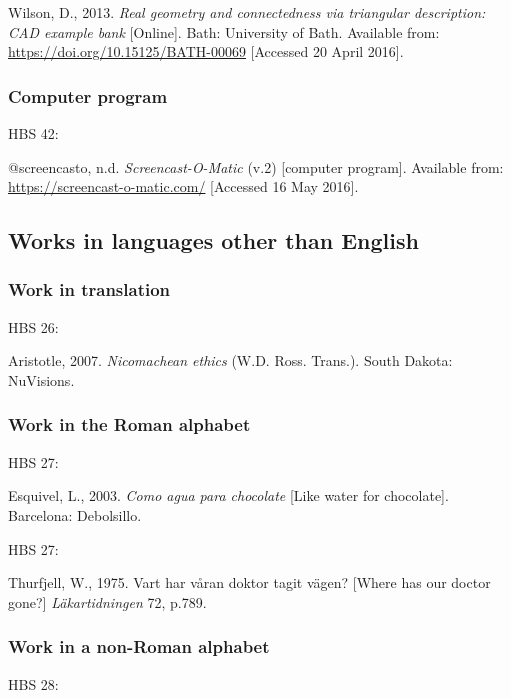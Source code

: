 Wilson, D., 2013. \emph{Real geometry and connectedness via triangular description: CAD example bank} [Online]. Bath: University of Bath. Available from: \url{https://doi.org/10.15125/BATH-00069} [Accessed 20 April 2016].



\subsubsection*{Computer program}

HBS 42: \cite{screencasto}

@screencasto, n.d. \emph{Screencast-O-Matic} (v.2) [computer program]. Available from: \url{https://screencast-o-matic.com/} [Accessed 16 May 2016].



\subsection{Works in languages other than English}

\subsubsection*{Work in translation}

HBS 26: \cite{aristotle2007ne}

Aristotle, 2007. \emph{Nicomachean ethics} (W.D. Ross. Trans.). South Dakota: NuVisions.



\subsubsection*{Work in the Roman alphabet}

HBS 27: \cite{esquivel2003cap}

Esquivel, L., 2003. \emph{Como agua para chocolate} [Like water for chocolate]. Barcelona: Debolsillo.



HBS 27: \cite{thurfjell1975vhv}

Thurfjell, W., 1975. Vart har våran doktor tagit vägen? [Where has our doctor gone?] \emph{Läkartidningen} 72, p.789.



\subsubsection*{Work in a non-Roman alphabet}

HBS 28: \cite{hua1999qys1}

